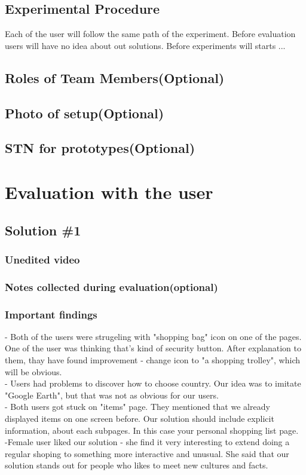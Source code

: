 \documentclass[a4paper,10pt,oneside]{scrreprt}
\begin{document}
\section{Experimental Procedure}
Each of the user will follow the same path of the experiment. Before evaluation users will have no idea about out solutions. Before experiments will starts ...

\section{Roles of Team Members(Optional)}

\section{Photo of setup(Optional)}

\section{STN for prototypes(Optional)}

\begingroup
\let\clearpage\relax
	\chapter{Evaluation with the user}
\endgroup

\section{Solution \#1}
\subsection{Unedited video}

\subsection{Notes collected during evaluation(optional)}

\subsection{Important findings}
- Both of the users were strugeling with "shopping bag" icon on one of the pages. One of the user was thinking that's kind of security button. After explanation to them, thay have found improvement - change icon to "a shopping trolley", which will be obvious.\\
- Users had problems to discover how to choose country. Our idea was to imitate "Google Earth", but that was not as obvious for our users. \\
- Both users got stuck on "items" page. They mentioned that we already displayed items on one screen before. Our solution should include explicit information, about each subpages. In this case your personal shopping list page.\\
-Female user liked our solution - she find it very interesting to extend doing a regular shoping to something more interactive and unusual. She said that our solution stands out for people who likes to meet new cultures and facts.
\end{document}
